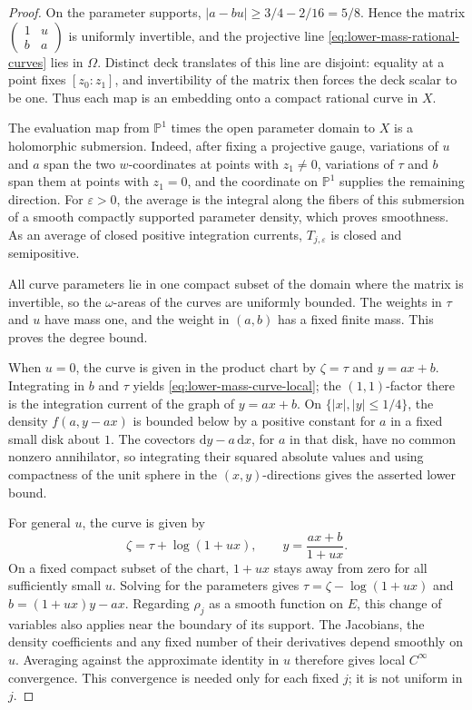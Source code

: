 \begin{proof}
On the parameter supports, $|a-bu|\geq3/4-2/16=5/8$. Hence the matrix
$\left(\begin{smallmatrix}1&u\\ b&a\end{smallmatrix}\right)$ is uniformly invertible, and the projective line \eqref{eq:lower-mass-rational-curves} lies in $\Omega$. Distinct deck translates of this line are disjoint: equality at a point fixes $[z_0:z_1]$, and invertibility of the matrix then forces the deck scalar to be one. Thus each map is an embedding onto a compact rational curve in $X$.

The evaluation map from $\mathbb P^1$ times the open parameter domain to $X$ is a holomorphic submersion. Indeed, after fixing a projective gauge, variations of $u$ and $a$ span the two $w$-coordinates at points with $z_1\ne0$, variations of $\tau$ and $b$ span them at points with $z_1=0$, and the coordinate on $\mathbb P^1$ supplies the remaining direction. For $\varepsilon>0$, the average is the integral along the fibers of this submersion of a smooth compactly supported parameter density, which proves smoothness. As an average of closed positive integration currents, $T_{j,\varepsilon}$ is closed and semipositive.

All curve parameters lie in one compact subset of the domain where the matrix is invertible, so the $\omega$-areas of the curves are uniformly bounded. The weights in $\tau$ and $u$ have mass one, and the weight in $(a,b)$ has a fixed finite mass. This proves the degree bound.

When $u=0$, the curve is given in the product chart by $\zeta=\tau$ and $y=ax+b$. Integrating in $b$ and $\tau$ yields \eqref{eq:lower-mass-curve-local}; the $(1,1)$-factor there is the integration current of the graph of $y=ax+b$. On $\{|x|,|y|\leq1/4\}$, the density $f(a,y-ax)$ is bounded below by a positive constant for $a$ in a fixed small disk about $1$. The covectors $\mathrm{d}y-a\,\mathrm{d}x$, for $a$ in that disk, have no common nonzero annihilator, so integrating their squared absolute values and using compactness of the unit sphere in the $(x,y)$-directions gives the asserted lower bound.

For general $u$, the curve is given by
\[
 \zeta=\tau+\log(1+ux),\qquad y=\frac{ax+b}{1+ux}.
\]
On a fixed compact subset of the chart, $1+ux$ stays away from zero for all sufficiently small $u$. Solving for the parameters gives
$\tau=\zeta-\log(1+ux)$ and $b=(1+ux)y-ax$. Regarding $\rho_j$ as a smooth function on $E$, this change of variables also applies near the boundary of its support. The Jacobians, the density coefficients and any fixed number of their derivatives depend smoothly on $u$. Averaging against the approximate identity in $u$ therefore gives local $C^\infty$ convergence. This convergence is needed only for each fixed $j$; it is not uniform in $j$.
\end{proof}

